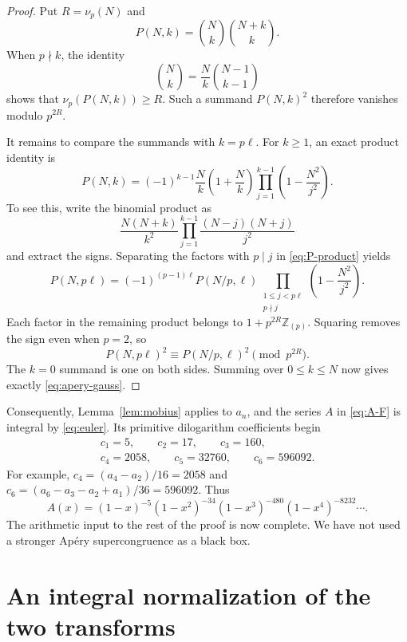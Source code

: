 \documentclass[11pt,letterpaper]{article}
\numberwithin{equation}{section}
\theoremstyle{definition}
\newcommand{\Z}{\mathbb Z}
\newcommand{\Zp}{\Z_{(p)}}
\begin{document}
\begin{proof}
Put $R=\nu_p(N)$ and
\[
P(N,k)=\binom Nk\binom{N+k}{k}.
\]
When $p\nmid k$, the identity
\[
\binom Nk=\frac Nk\binom{N-1}{k-1}
\]
shows that $\nu_p(P(N,k))\geq R$. Such a summand $P(N,k)^2$ therefore
vanishes modulo $p^{2R}$.

It remains to compare the summands with $k=p\ell$. For $k\geq1$, an
exact product identity is
\begin{equation}\label{eq:P-product}
P(N,k)=(-1)^{k-1}\frac Nk\left(1+\frac Nk\right)
  \prod_{j=1}^{k-1}\left(1-\frac{N^2}{j^2}\right).
\end{equation}
To see this, write the binomial product as
\[
\frac{N(N+k)}{k^2}
\prod_{j=1}^{k-1}\frac{(N-j)(N+j)}{j^2}
\]
and extract the signs. Separating the factors with $p\mid j$ in
\eqref{eq:P-product} yields
\begin{equation}\label{eq:P-split}
P(N,p\ell)=(-1)^{(p-1)\ell}P(N/p,\ell)
 \prod_{\substack{1\leq j<p\ell\\p\nmid j}}
 \left(1-\frac{N^2}{j^2}\right).
\end{equation}
Each factor in the remaining product belongs to
$1+p^{2R}\Zp$. Squaring removes the sign even when $p=2$, so
\[
P(N,p\ell)^2\equiv P(N/p,\ell)^2\pmod{p^{2R}}.
\]
The $k=0$ summand is one on both sides. Summing over $0\leq k\leq N$
now gives exactly \eqref{eq:apery-gauss}.
\end{proof}

Consequently, Lemma~\ref{lem:mobius} applies to $a_n$, and the series
$A$ in \eqref{eq:A-F} is integral by \eqref{eq:euler}. Its primitive
dilogarithm coefficients begin
\begin{equation}\label{eq:initial-c}
\begin{gathered}
c_1=5,\qquad c_2=17,\qquad c_3=160,\\
c_4=2058,\qquad c_5=32760,\qquad c_6=596092.
\end{gathered}
\end{equation}
For example, $c_4=(a_4-a_2)/16=2058$ and
$c_6=(a_6-a_3-a_2+a_1)/36=596092$. Thus
\[
A(x)=(1-x)^{-5}(1-x^2)^{-34}(1-x^3)^{-480}
       (1-x^4)^{-8232}\cdots.
\]
The arithmetic input to the rest of the proof is now complete. We have
not used a stronger Ap\'ery supercongruence as a black box.

\section{An integral normalization of the two transforms}\label{sec:normalization}
\end{document}
